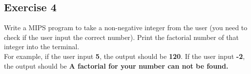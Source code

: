 \subsection{Exercise 4}
Write a MIPS program to take a non-negative integer from the user (you
need to check if the user input the correct number). Print the factorial
number of that integer into the terminal.\\
For example, if the user input \textbf{5}, the output should be \textbf{120}. If the user
input \textbf{-2}, the output should be \textbf{A factorial for your number can not be
found.}

